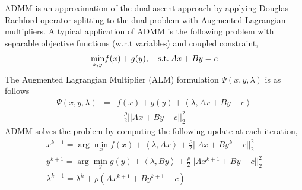 \documentclass[twoside,leqno,twocolumn]{article}
\begin{document}
ADMM is an approximation of the dual ascent approach by applying Douglas-Rachford
operator splitting to the dual problem with Augmented Lagrangian
multipliers. 
A typical application of ADMM is the following problem with separable
objective functions (w.r.t variables) and coupled constraint, 
%
\begin{equation}
{\min_{x,y}}f(x)+g(y),\quad{\rm {s.t.}}\:Ax+By=c
\end{equation}
%
The Augmented Lagrangian  Multiplier (ALM) formulation $\Psi(x,y,\lambda)$ is as
follows
% 
\begin{eqnarray}
\nonumber
\Psi (x,y,\lambda ) &=& f(x) + g(y) +  \left\langle {\lambda ,Ax + By - c} \right\rangle \\
& & + \frac{\rho }{2}||Ax + By - c||_2^2
\end{eqnarray}
%
ADMM solves the problem by computing the following update at each iteration, 
\begin{equation}
\begin{array}{l}
{x^{k + 1}} = \arg \mathop {\min }\limits_x f(x) +  \left\langle {\lambda ,Ax} \right\rangle  + \frac{\rho }{2}||Ax + B{y^k} - c||_2^2\\
{y^{k + 1}} = \arg \mathop {\min }\limits_y g(y) +  \left\langle {\lambda ,By} \right\rangle  + \frac{\rho }{2}||A{x^{k+1}} + By - c||_2^2\\
{\lambda ^{k + 1}} = {\lambda ^k} + \rho (A{x^{k + 1}} + B{y^{k + 1}} - c)
\end{array}
\end{equation}
\end{document}
